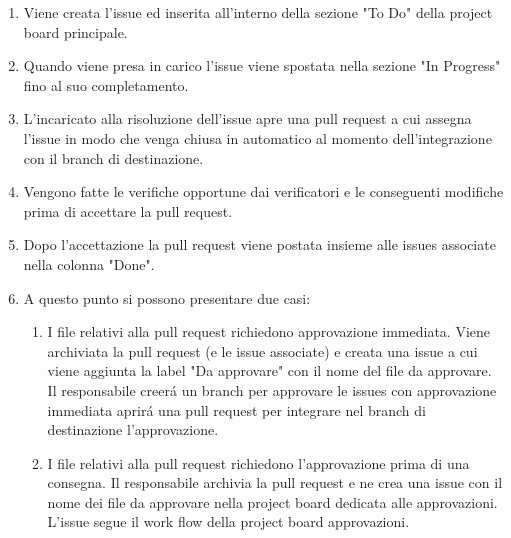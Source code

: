 \begin{enumerate}
	\item Viene creata l'issue ed inserita all'interno della sezione "To Do" della project board principale.
	\item Quando viene presa in carico l'issue viene spostata nella sezione "In Progress" fino al suo completamento.
	\item L'incaricato alla risoluzione dell'issue apre una pull request a cui assegna l'issue in modo che  venga chiusa in automatico al momento dell'integrazione con il branch di destinazione.
	\item Vengono fatte le verifiche opportune dai verificatori e le conseguenti modifiche prima di accettare la pull request.
	\item Dopo l'accettazione la pull request viene postata insieme alle issues associate nella colonna "Done".
	\item A questo punto si possono presentare due casi: 
	\begin{enumerate}
		\item I file relativi alla pull request richiedono approvazione immediata.
		Viene archiviata la pull request (e le issue associate) e creata una issue a cui viene aggiunta la label "Da approvare" con il nome del file da approvare.
		Il responsabile creerá un branch per approvare le issues con approvazione immediata aprirá una pull request per integrare nel branch di destinazione l'approvazione.
		\item I file relativi alla pull request richiedono l'approvazione prima di una consegna.
		Il responsabile archivia la pull request e ne crea una issue con il nome dei file da approvare nella project board dedicata alle approvazioni.
		L'issue segue il work flow della project board approvazioni.
	\end{enumerate}
\end{enumerate}
